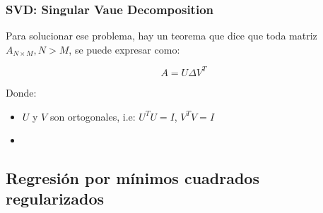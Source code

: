 \subsubsection{SVD: Singular Vaue Decomposition}
 Para solucionar ese problema, hay un teorema que dice que toda matriz $A_{N\times M}, N > M$, se puede expresar como:

 \begin{equation*}
   A = U\Delta V^T
 \end{equation*}

 Donde:

 \begin{itemize}
   \item $U$ y $V$ son ortogonales, i.e: $U^TU = I$, $V^TV = I$
   \item
 \end{itemize}


 \subsection{Regresión por mínimos cuadrados regularizados}

